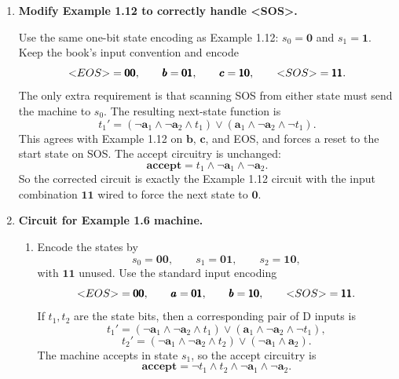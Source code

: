\documentclass[11pt,openany]{book}
\def\<{\text{\textless}}
\def\>{\text{\textgreater}}
\begin{document}
\begin{enumerate}[{1.}1.]
\item \textbf{Modify Example 1.12 to correctly handle \textless SOS\textgreater.}

Use the same one-bit state encoding as Example 1.12: $s_0=\pmb{0}$ and $s_1=\pmb{1}$. Keep the book's input convention and encode
\[
\<EOS\>=\pmb{00},\qquad \pmb{b}=\pmb{01},\qquad \pmb{c}=\pmb{10},\qquad \<SOS\>=\pmb{11}.
\]
The only extra requirement is that scanning \<SOS\> from either state must send the machine to $s_0$. The resulting next-state function is
\[
t_1'=(\neg \pmb{a}_1\wedge \neg \pmb{a}_2\wedge t_1)\vee
(\pmb{a}_1\wedge \neg \pmb{a}_2\wedge \neg t_1).
\]
This agrees with Example 1.12 on $\pmb{b}$, $\pmb{c}$, and \<EOS\>, and forces a reset to the start state on \<SOS\>. The accept circuitry is unchanged:
\[
\textbf{accept}=t_1\wedge \neg \pmb{a}_1\wedge \neg \pmb{a}_2.
\]
So the corrected circuit is exactly the Example 1.12 circuit with the input combination $\pmb{11}$ wired to force the next state to $\pmb{0}$.

\begin{center}
\end{center}

\item \textbf{Circuit for Example 1.6 machine.}
\begin{enumerate}
\item Encode the states by
\[
s_0=\pmb{00},\qquad s_1=\pmb{01},\qquad s_2=\pmb{10},
\]
with $\pmb{11}$ unused. Use the standard input encoding
\[
\<EOS\>=\pmb{00},\qquad \pmb{a}=\pmb{01},\qquad \pmb{b}=\pmb{10},\qquad \<SOS\>=\pmb{11}.
\]
If $t_1,t_2$ are the state bits, then a corresponding pair of D inputs is
\[
t_1'=(\neg \pmb{a}_1\wedge \neg \pmb{a}_2\wedge t_1)\vee
(\pmb{a}_1\wedge \neg \pmb{a}_2\wedge \neg t_1),
\]
\[
t_2'=(\neg \pmb{a}_1\wedge \neg \pmb{a}_2\wedge t_2)\vee(\neg \pmb{a}_1\wedge \pmb{a}_2).
\]
The machine accepts in state $s_1$, so the accept circuitry is
\[
\textbf{accept}=\neg t_1\wedge t_2\wedge \neg \pmb{a}_1\wedge \neg \pmb{a}_2.
\]


\end{enumerate}
\end{enumerate}
\end{document}
